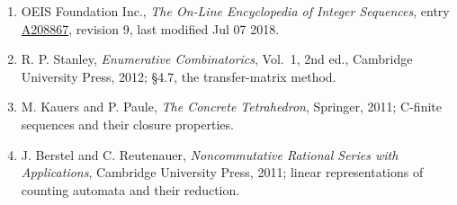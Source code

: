 \documentclass[11pt]{article}
\theoremstyle{definition}
\begin{document}
\begin{enumerate}

\item OEIS Foundation Inc., \emph{The On-Line Encyclopedia of Integer Sequences}, entry \href{https://oeis.org/A208867}{A208867}, revision 9, last modified Jul 07 2018.

\item R. P. Stanley, \emph{Enumerative Combinatorics}, Vol.~1, 2nd ed., Cambridge University Press, 2012; \S4.7, the transfer-matrix method.

\item M. Kauers and P. Paule, \emph{The Concrete Tetrahedron}, Springer, 2011; C-finite sequences and their closure properties.

\item J. Berstel and C. Reutenauer, \emph{Noncommutative Rational Series with Applications}, Cambridge University Press, 2011; linear representations of counting automata and their reduction.

\end{enumerate}
\end{document}

